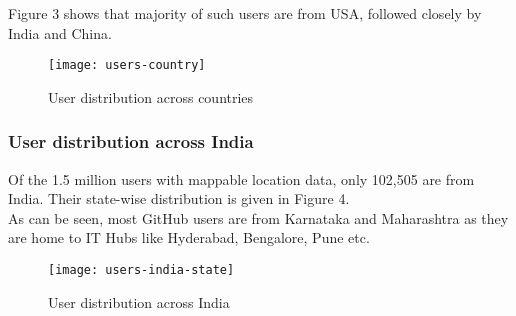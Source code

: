 Figure 3 shows that majority of such users are from USA, followed closely by India and China.


\begin{figure}[htb]
\centering
\texttt{[image: users-country]}
\caption{User distribution across countries}
\end{figure}

\subsubsection{User distribution across India}

Of the 1.5 million users with mappable location data, only 102,505 are from India.
Their state-wise distribution is given in Figure 4. \\

As can be seen, most GitHub users are from Karnataka and Maharashtra as they are home to
IT Hubs like Hyderabad, Bengalore, Pune etc.

\begin{figure}[htb]
\centering
\texttt{[image: users-india-state]}
\caption{User distribution across India}
\end{figure}
